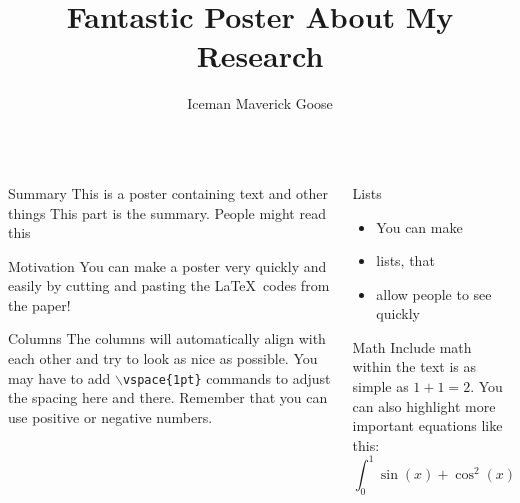 \documentclass[serif,mathserif,final]{beamer}
\title{Fantastic Poster About My Research}
\author{Iceman \quad Maverick \quad Goose}
\institute{Georgia Institute of Technology, Atlanta, GA}
\begin{document}
\begin{frame}{}
  \begin{columns}[t]

    \begin{column}{0.32\linewidth}

      \begin{block}{Summary}
        This is a poster containing text and other things
        This part is the summary.  People might read this
      \end{block}

      \begin{block}{Motivation}
        You can make a poster very quickly and easily by cutting and pasting
        the \LaTeX~codes from the paper!
      \end{block}

      \begin{block}{Columns}
        The columns will automatically align with each other and try to look
        as nice as possible.  You may have to add {\tt$\backslash$vspace\{1pt\}}
        commands to adjust the spacing here and there.  Remember that you can
        use positive or negative numbers.
      \end{block}

    \end{column}%

    \begin{column}{0.32\linewidth}

      \begin{block}{Lists}
        \begin{itemize}
          \item You can make
          \item lists, that
          \item allow people to see quickly
        \end{itemize}
      \end{block}

      \begin{block}{Math}
        Include math within the text is as simple as $1+1=2$.  You can also
        highlight more important equations like this:
        \begin{equation*}
          \int_0^1\sin(x)+\cos^2(x)+\alpha x~d\!x
        \end{equation*}
      \end{block}


\end{column}
\end{columns}
\end{frame}
\end{document}

